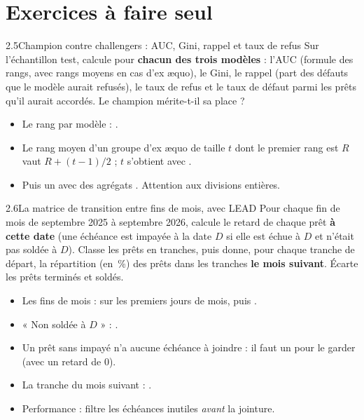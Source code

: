 \section{Exercices à faire seul}

\begin{exercice}{2.5}{Champion contre challengers : AUC, Gini, rappel et taux de refus}
Sur l'échantillon test, calcule pour \textbf{chacun des trois modèles} : l'AUC (formule des rangs, avec
rangs moyens en cas d'ex æquo), le Gini, le rappel (part des défauts que le modèle aurait refusés), le
taux de refus et le taux de défaut parmi les prêts qu'il aurait accordés. Le champion mérite-t-il sa
place ?
\end{exercice}

\begin{indice}
\begin{itemize}
\item Le rang par modèle : .
\item Le rang moyen d'un groupe d'ex æquo de taille $t$ dont le premier rang est $R$ vaut
$R + (t-1)/2$ ; $t$ s'obtient avec .
\item Puis un  avec des agrégats . Attention aux divisions
entières.
\end{itemize}
\end{indice}

\begin{exercice}{2.6}{La matrice de transition entre fins de mois, avec LEAD}
Pour chaque fin de mois de septembre 2025 à septembre 2026, calcule le retard de chaque prêt
\textbf{à cette date} (une échéance est impayée à la date $D$ si elle est échue à $D$ et n'était pas
soldée à $D$). Classe les prêts en tranches, puis donne, pour chaque tranche de départ, la répartition
(en~\%) des prêts dans les tranches \textbf{le mois suivant}. Écarte les prêts terminés et soldés.
\end{exercice}

\begin{indice}
\begin{itemize}
\item Les fins de mois :  sur les premiers jours de mois, puis
.
\item « Non soldée à $D$ » : .
\item Un prêt sans impayé n'a aucune échéance à joindre : il faut un  pour le garder
(avec un retard de 0).
\item La tranche du mois suivant : .
\item Performance : filtre les échéances inutiles \emph{avant} la jointure.
\end{itemize}
\end{indice}

